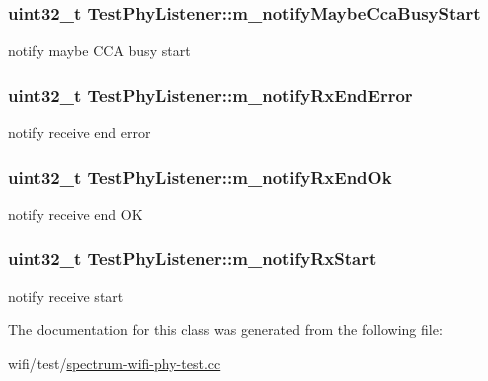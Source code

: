 \subsubsection[{\texorpdfstring{m\+\_\+notify\+Maybe\+Cca\+Busy\+Start}{m_notifyMaybeCcaBusyStart}}]{\setlength{\rightskip}{0pt plus 5cm}uint32\+\_\+t Test\+Phy\+Listener\+::m\+\_\+notify\+Maybe\+Cca\+Busy\+Start}\hypertarget{classTestPhyListener_a89573c858e44046755038d10d0675e39}{}\label{classTestPhyListener_a89573c858e44046755038d10d0675e39}


notify maybe C\+CA busy start 

\subsubsection[{\texorpdfstring{m\+\_\+notify\+Rx\+End\+Error}{m_notifyRxEndError}}]{\setlength{\rightskip}{0pt plus 5cm}uint32\+\_\+t Test\+Phy\+Listener\+::m\+\_\+notify\+Rx\+End\+Error}\hypertarget{classTestPhyListener_ae7a2d3f6f0e016f7672212968476f6e3}{}\label{classTestPhyListener_ae7a2d3f6f0e016f7672212968476f6e3}


notify receive end error 

\subsubsection[{\texorpdfstring{m\+\_\+notify\+Rx\+End\+Ok}{m_notifyRxEndOk}}]{\setlength{\rightskip}{0pt plus 5cm}uint32\+\_\+t Test\+Phy\+Listener\+::m\+\_\+notify\+Rx\+End\+Ok}\hypertarget{classTestPhyListener_acd11962c5bf6fdbce50900422869997c}{}\label{classTestPhyListener_acd11962c5bf6fdbce50900422869997c}


notify receive end OK 

\subsubsection[{\texorpdfstring{m\+\_\+notify\+Rx\+Start}{m_notifyRxStart}}]{\setlength{\rightskip}{0pt plus 5cm}uint32\+\_\+t Test\+Phy\+Listener\+::m\+\_\+notify\+Rx\+Start}\hypertarget{classTestPhyListener_a96979fcd1bcf02b4b995d657c9c38a69}{}\label{classTestPhyListener_a96979fcd1bcf02b4b995d657c9c38a69}


notify receive start 



The documentation for this class was generated from the following file\+:\begin{DoxyCompactItemize}
\item 
wifi/test/\hyperlink{spectrum-wifi-phy-test_8cc}{spectrum-\/wifi-\/phy-\/test.\+cc}\end{DoxyCompactItemize}
